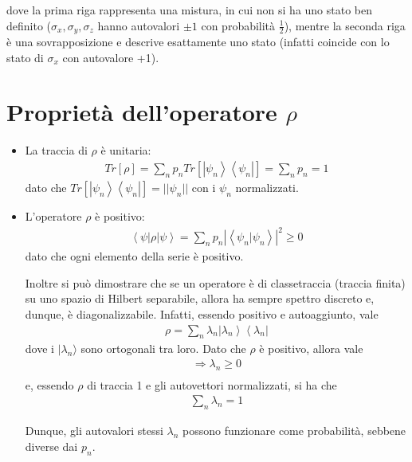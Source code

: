 dove la prima riga rappresenta una mistura, in cui non si ha uno stato ben definito ($\sigma_x, \sigma_y, \sigma_z$ hanno autovalori $\pm1$ con probabilità $\frac{1}{2}$), mentre la seconda riga è una sovrapposizione e descrive esattamente uno stato (infatti coincide con lo stato di $\sigma_x$ con autovalore +1). 

\section{Proprietà dell'operatore $\rho$} %

\begin{itemize}

\item La traccia di $\rho$ è unitaria:
\begin{equation}\begin{split}
Tr\left[\rho\right]=\sum_n{p_nTr\left[\left |\psi _n \right\rangle\left\langle \psi _n\right |\right]}= \sum_n{p_n} = 1
\end{split}\end{equation}
dato che $Tr\left[\left |\psi _n \right\rangle\left\langle \psi _n\right |\right] = ||\psi_n || $ con i $\psi_n$ normalizzati.

\item L'operatore $\rho$ è positivo:
\begin{equation}\begin{split}
\left\langle \psi |\rho|\psi  \right\rangle=\sum_n{p_n |\left\langle \psi_n | \psi_n \right\rangle|^2}\ge 0
\end{split}\end{equation}
dato che ogni elemento della serie è positivo.

Inoltre si può dimostrare che se un operatore è di classetraccia (traccia finita) su uno spazio di Hilbert separabile, allora ha sempre spettro discreto e, dunque, è diagonalizzabile. Infatti, essendo positivo e autoaggiunto, vale
\begin{equation}\begin{split}
\rho=\sum_n{\lambda_n\left |\lambda_n \right\rangle\left\langle \lambda_n\right |}
\end{split}\end{equation}
dove i $|\lambda_n\rangle$ sono ortogonali tra loro.
Dato che $\rho$ è positivo, allora vale
\begin{equation}\begin{split}
\Longrightarrow \lambda _n\ge 0 \\
\end{split}\end{equation}
e, essendo $\rho$ di traccia 1 e gli autovettori normalizzati, si ha che
\begin{equation}\begin{split}
\sum_n{\lambda_n}=1
\end{split}\end{equation}

Dunque, gli autovalori stessi $\lambda_n$ possono funzionare come probabilità, sebbene diverse dai $p_n$.
\end{itemize}

